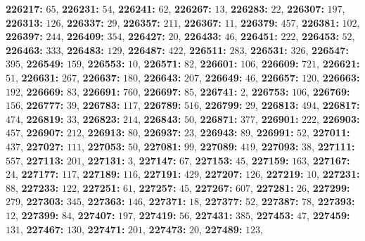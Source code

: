 \textsf{\bfseries 226217:} $65$, \textsf{\bfseries 226231:} $54$, \textsf{\bfseries 226241:} $62$, \textsf{\bfseries 226267:} $13$, \textsf{\bfseries 226283:} $22$, \textsf{\bfseries 226307:} $197$, \textsf{\bfseries 226313:} $126$, \textsf{\bfseries 226337:} $29$, \textsf{\bfseries 226357:} $211$, \textsf{\bfseries 226367:} $11$, \textsf{\bfseries 226379:} $457$, \textsf{\bfseries 226381:} $102$, \textsf{\bfseries 226397:} $244$, \textsf{\bfseries 226409:} $354$, \textsf{\bfseries 226427:} $20$, \textsf{\bfseries 226433:} $46$, \textsf{\bfseries 226451:} $222$, \textsf{\bfseries 226453:} $52$, \textsf{\bfseries 226463:} $333$, \textsf{\bfseries 226483:} $129$, \textsf{\bfseries 226487:} $422$, \textsf{\bfseries 226511:} $283$, \textsf{\bfseries 226531:} $326$, \textsf{\bfseries 226547:} $395$, \textsf{\bfseries 226549:} $159$, \textsf{\bfseries 226553:} $10$, \textsf{\bfseries 226571:} $82$, \textsf{\bfseries 226601:} $106$, \textsf{\bfseries 226609:} $721$, \textsf{\bfseries 226621:} $51$, \textsf{\bfseries 226631:} $267$, \textsf{\bfseries 226637:} $180$, \textsf{\bfseries 226643:} $207$, \textsf{\bfseries 226649:} $46$, \textsf{\bfseries 226657:} $120$, \textsf{\bfseries 226663:} $192$, \textsf{\bfseries 226669:} $83$, \textsf{\bfseries 226691:} $760$, \textsf{\bfseries 226697:} $85$, \textsf{\bfseries 226741:} $2$, \textsf{\bfseries 226753:} $106$, \textsf{\bfseries 226769:} $156$, \textsf{\bfseries 226777:} $39$, \textsf{\bfseries 226783:} $117$, \textsf{\bfseries 226789:} $516$, \textsf{\bfseries 226799:} $29$, \textsf{\bfseries 226813:} $494$, \textsf{\bfseries 226817:} $474$, \textsf{\bfseries 226819:} $33$, \textsf{\bfseries 226823:} $214$, \textsf{\bfseries 226843:} $50$, \textsf{\bfseries 226871:} $377$, \textsf{\bfseries 226901:} $222$, \textsf{\bfseries 226903:} $457$, \textsf{\bfseries 226907:} $212$, \textsf{\bfseries 226913:} $80$, \textsf{\bfseries 226937:} $23$, \textsf{\bfseries 226943:} $89$, \textsf{\bfseries 226991:} $52$, \textsf{\bfseries 227011:} $437$, \textsf{\bfseries 227027:} $111$, \textsf{\bfseries 227053:} $50$, \textsf{\bfseries 227081:} $99$, \textsf{\bfseries 227089:} $419$, \textsf{\bfseries 227093:} $38$, \textsf{\bfseries 227111:} $557$, \textsf{\bfseries 227113:} $201$, \textsf{\bfseries 227131:} $3$, \textsf{\bfseries 227147:} $67$, \textsf{\bfseries 227153:} $45$, \textsf{\bfseries 227159:} $163$, \textsf{\bfseries 227167:} $24$, \textsf{\bfseries 227177:} $117$, \textsf{\bfseries 227189:} $116$, \textsf{\bfseries 227191:} $429$, \textsf{\bfseries 227207:} $126$, \textsf{\bfseries 227219:} $10$, \textsf{\bfseries 227231:} $88$, \textsf{\bfseries 227233:} $122$, \textsf{\bfseries 227251:} $61$, \textsf{\bfseries 227257:} $45$, \textsf{\bfseries 227267:} $607$, \textsf{\bfseries 227281:} $26$, \textsf{\bfseries 227299:} $279$, \textsf{\bfseries 227303:} $345$, \textsf{\bfseries 227363:} $146$, \textsf{\bfseries 227371:} $18$, \textsf{\bfseries 227377:} $52$, \textsf{\bfseries 227387:} $78$, \textsf{\bfseries 227393:} $12$, \textsf{\bfseries 227399:} $84$, \textsf{\bfseries 227407:} $197$, \textsf{\bfseries 227419:} $56$, \textsf{\bfseries 227431:} $385$, \textsf{\bfseries 227453:} $47$, \textsf{\bfseries 227459:} $131$, \textsf{\bfseries 227467:} $130$, \textsf{\bfseries 227471:} $201$, \textsf{\bfseries 227473:} $20$, \textsf{\bfseries 227489:} $123$, 
